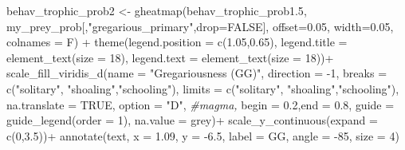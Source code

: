 \documentclass[
]{article}
\newenvironment{Shaded}{\begin{snugshade}}{\end{snugshade}}
\newcommand{\AttributeTok}[1]{\textcolor[rgb]{0.77,0.63,0.00}{#1}}
\newcommand{\CommentTok}[1]{\textcolor[rgb]{0.56,0.35,0.01}{\textit{#1}}}
\newcommand{\ConstantTok}[1]{\textcolor[rgb]{0.00,0.00,0.00}{#1}}
\newcommand{\DecValTok}[1]{\textcolor[rgb]{0.00,0.00,0.81}{#1}}
\newcommand{\FloatTok}[1]{\textcolor[rgb]{0.00,0.00,0.81}{#1}}
\newcommand{\FunctionTok}[1]{\textcolor[rgb]{0.00,0.00,0.00}{#1}}
\newcommand{\NormalTok}[1]{#1}
\newcommand{\OtherTok}[1]{\textcolor[rgb]{0.56,0.35,0.01}{#1}}
\newcommand{\SpecialCharTok}[1]{\textcolor[rgb]{0.00,0.00,0.00}{#1}}
\newcommand{\StringTok}[1]{\textcolor[rgb]{0.31,0.60,0.02}{#1}}
\begin{document}
\begin{Shaded}
\begin{Highlighting}[]
\NormalTok{behav\_trophic\_prob2 }\OtherTok{\textless{}{-}} \FunctionTok{gheatmap}\NormalTok{(behav\_trophic\_prob1}\FloatTok{.5}\NormalTok{, my\_prey\_prob[,}\StringTok{"gregarious\_primary"}\NormalTok{,}\AttributeTok{drop=}\ConstantTok{FALSE}\NormalTok{], }
                                \AttributeTok{offset=}\FloatTok{0.05}\NormalTok{, }\AttributeTok{width=}\FloatTok{0.05}\NormalTok{, }\AttributeTok{colnames =}\NormalTok{ F) }\SpecialCharTok{+}
   \FunctionTok{theme}\NormalTok{(}\AttributeTok{legend.position =} \FunctionTok{c}\NormalTok{(}\FloatTok{1.05}\NormalTok{,}\FloatTok{0.65}\NormalTok{),}
        \AttributeTok{legend.title =} \FunctionTok{element\_text}\NormalTok{(}\AttributeTok{size =} \DecValTok{18}\NormalTok{), }
        \AttributeTok{legend.text =} \FunctionTok{element\_text}\NormalTok{(}\AttributeTok{size =} \DecValTok{18}\NormalTok{))}\SpecialCharTok{+}
  \FunctionTok{scale\_fill\_viridis\_d}\NormalTok{(}\AttributeTok{name =} \StringTok{"Gregariousness (GG)"}\NormalTok{, }
                       \AttributeTok{direction =} \SpecialCharTok{{-}}\DecValTok{1}\NormalTok{,}
                       \AttributeTok{breaks =} \FunctionTok{c}\NormalTok{(}\StringTok{"solitary"}\NormalTok{, }\StringTok{"shoaling"}\NormalTok{,}\StringTok{"schooling"}\NormalTok{),}
                       \AttributeTok{limits =} \FunctionTok{c}\NormalTok{(}\StringTok{"solitary"}\NormalTok{, }\StringTok{"shoaling"}\NormalTok{,}\StringTok{"schooling"}\NormalTok{),}
                       \AttributeTok{na.translate =} \ConstantTok{TRUE}\NormalTok{,}
                       \AttributeTok{option =} \StringTok{"D"}\NormalTok{, }\CommentTok{\#\textquotesingle{}magma\textquotesingle{},}
                       \AttributeTok{begin =} \FloatTok{0.2}\NormalTok{,}\AttributeTok{end =} \FloatTok{0.8}\NormalTok{,}
                       \AttributeTok{guide =} \FunctionTok{guide\_legend}\NormalTok{(}\AttributeTok{order =} \DecValTok{1}\NormalTok{), }
                       \AttributeTok{na.value =} \StringTok{\textquotesingle{}grey\textquotesingle{}}\NormalTok{)}\SpecialCharTok{+}
  \FunctionTok{scale\_y\_continuous}\NormalTok{(}\AttributeTok{expand =} \FunctionTok{c}\NormalTok{(}\DecValTok{0}\NormalTok{,}\FloatTok{3.5}\NormalTok{))}\SpecialCharTok{+}
  \FunctionTok{annotate}\NormalTok{(}\StringTok{\textquotesingle{}text\textquotesingle{}}\NormalTok{, }\AttributeTok{x =} \FloatTok{1.09}\NormalTok{, }\AttributeTok{y =} \SpecialCharTok{{-}}\FloatTok{6.5}\NormalTok{, }\AttributeTok{label =} \StringTok{\textquotesingle{}GG\textquotesingle{}}\NormalTok{, }\AttributeTok{angle =} \SpecialCharTok{{-}}\DecValTok{85}\NormalTok{, }\AttributeTok{size =} \DecValTok{4}\NormalTok{)}


\end{Highlighting}
\end{Shaded}
\end{document}
